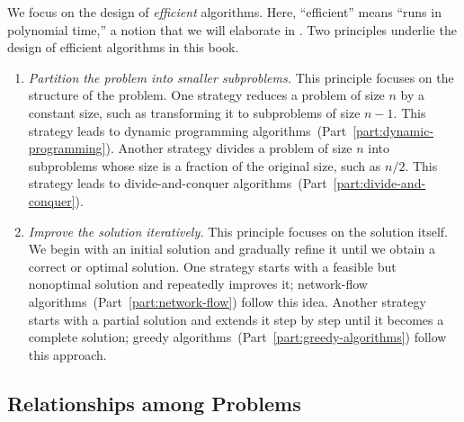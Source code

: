 We focus on the design of \emph{efficient} algorithms. Here,
``efficient'' means ``runs in polynomial time,'' a notion that we will elaborate
in .
Two principles underlie the design of efficient algorithms in this book.

\begin{enumerate}

  \item \emph{Partition the problem into smaller subproblems.} This principle
  focuses on the structure of the problem. One strategy reduces a problem of
  size $n$ by a constant size, such as transforming it to subproblems of
  size $n-1$. This strategy leads to dynamic programming
  algorithms~(Part~\ref{part:dynamic-programming}). Another strategy divides a
  problem of size $n$ into subproblems whose size is a
  fraction of the original size, such as $n/2$. This strategy leads to
  divide-and-conquer algorithms~(Part~\ref{part:divide-and-conquer}).

  \item \emph{Improve the solution iteratively.} This principle focuses on the
  solution itself. We begin with an initial solution and gradually refine it
  until we obtain a correct or optimal solution. One strategy starts with a
  feasible but nonoptimal solution and repeatedly improves it; network-flow
  algorithms~(Part~\ref{part:network-flow}) follow this idea. Another strategy
  starts with a partial solution and extends it step by step until it becomes a
  complete solution; greedy algorithms~(Part~\ref{part:greedy-algorithms}) follow
  this approach.

\end{enumerate}

\subsection*{Relationships among Problems}

